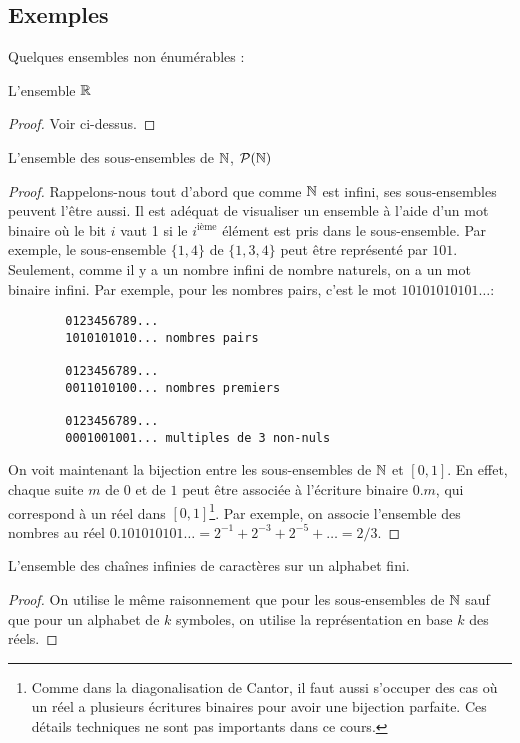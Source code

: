 \subsection{Exemples}
\label{subsec:exemples_non_enum}

Quelques ensembles non énumérables :
\begin{myexem}
 L'ensemble $\mathbb{R}$
 \begin{proof}
   Voir ci-dessus.
 \end{proof}
\end{myexem}

\begin{myexem}
 L'ensemble des sous-ensembles de $\mathbb{N}$, $\mathcal{P}(\mathbb{N})$
 \begin{proof}
   Rappelons-nous tout d'abord que comme $\mathbb{N}$ est infini, ses sous-ensembles peuvent l'être aussi.
   Il est adéquat de visualiser un ensemble à l'aide d'un mot binaire
   où le bit $i$ vaut 1 si le $i^{\mathrm{ième}}$ élément est pris dans le sous-ensemble.
   Par exemple, le sous-ensemble $\{1,4\}$ de $\{1,3,4\}$ peut être représenté par $101$.
   Seulement, comme il y a un nombre infini de nombre naturels, on a un mot binaire infini.
   Par exemple, pour les nombres pairs, c'est le mot $10101010101\ldots$:
   \begin{verbatim}
		0123456789...
		1010101010... nombres pairs

		0123456789...
		0011010100... nombres premiers

		0123456789...
		0001001001... multiples de 3 non-nuls
    \end{verbatim}
   On voit maintenant la bijection entre les sous-ensembles de $\mathbb{N}$ et $[0,1]$.
   En effet, chaque suite $m$ de $0$ et de $1$ peut être associée à l'écriture binaire $0.m$, qui correspond à un réel dans $[0,1]$\footnote{Comme dans la diagonalisation de Cantor, il faut aussi s'occuper des cas où un réel a plusieurs écritures binaires pour avoir une bijection parfaite. Ces détails techniques ne sont pas importants dans ce cours.}. Par exemple, on associe l'ensemble des nombres au réel $0.101010101\ldots = 2^{-1}+2^{-3}+2^{-5}+\ldots = 2/3$.
 \end{proof}
\end{myexem}

\begin{myexem}
 L'ensemble des chaînes infinies de caractères sur un alphabet fini.
 \begin{proof}
   On utilise le même raisonnement que pour les sous-ensembles de $\mathbb{N}$ sauf que pour un alphabet de $k$ symboles,
   on utilise la représentation en base $k$ des réels.
 \end{proof}
\end{myexem}

